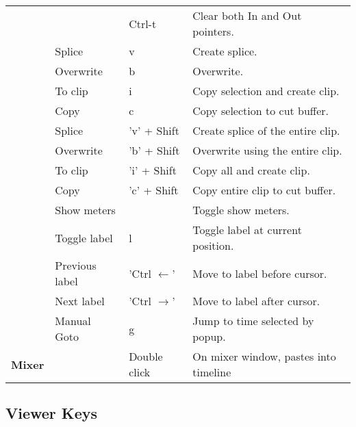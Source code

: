 \begin{longtable}[h]{>{\bfseries}p{}p{}p{}p{}}
  &  & Ctrl-t & Clear both In and Out pointers. \\
  & Splice & v & Create splice. \\
  & Overwrite & b & Overwrite. \\
  & To clip & i & Copy selection and create clip. \\
  & Copy & c & Copy selection to cut buffer. \\
  & Splice & 'v' + Shift & Create splice of the entire clip. \\
  & Overwrite & 'b' + Shift & Overwrite using the entire clip. \\
  & To clip & 'i' + Shift & Copy all and create clip. \\
  & Copy & 'c' + Shift & Copy entire clip to cut buffer. \\
  & Show meters &  & Toggle show meters. \\
  & Toggle label & l & Toggle label at current position. \\
  & Previous label & 'Ctrl $\leftarrow$' & Move to label before cursor. \\
  & Next label & 'Ctrl $\rightarrow$' & Move to label after cursor. \\
  & Manual Goto & g & Jump to time selected by popup. \\
  \midrule
  \textcolor{CinBlueText}{Mixer} &  & Double click & On mixer window, pastes into timeline\\
  \bottomrule
\end{longtable}


\subsection*{Viewer Keys }%
\label{ssec:viewer_keys}

